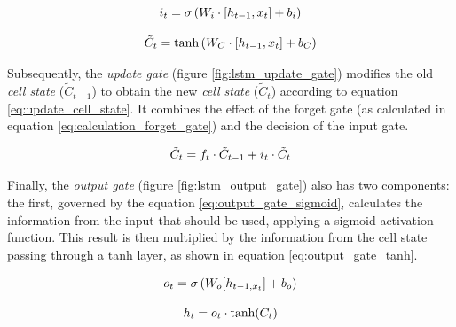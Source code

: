 \begin{equation}
    \centering
    i_t = \sigma \left(W_i \cdot [h_{t-1}, x_t] + b_i \right)
    \label{eq:input_gate}
\end{equation}

\begin{equation}
    \centering
    \tilde{C}_t = \text{tanh} \left(W_C \cdot [h_{t-1}, x_t] + b_C \right)
    \label{eq:candidates_cell_state}
\end{equation}

\noindent
Subsequently, the \textit{update gate} (figure \ref{fig:lstm_update_gate}) modifies the old \textit{cell state} ($\tilde{C}_{t-1}$) to obtain the new \textit{cell state} ($\tilde{C}_t$) according to equation \ref{eq:update_cell_state}. It combines the effect of the forget gate (as calculated in equation \ref{eq:calculation_forget_gate}) and the decision of the input gate.

\begin{equation}
    \centering
    \tilde{C}_t = f_t \cdot \tilde{C}_{t-1} + i_t \cdot \tilde{C}_{t}
    \label{eq:update_cell_state}
\end{equation}

\noindent
Finally, the \textit{output gate} (figure \ref{fig:lstm_output_gate}) also has two components: the first, governed by the equation \ref{eq:output_gate_sigmoid}, calculates the information from the input that should be used, applying a sigmoid activation function. This result is then multiplied by the information from the cell state passing through a \gls{tanh} layer, as shown in equation \ref{eq:output_gate_tanh}.

\begin{equation}
    \centering
    o_t = \sigma \left( W_o [h_{t-1,x_t}] + b_o \right)
    \label{eq:output_gate_sigmoid}
\end{equation}

\begin{equation}
    \centering
    h_t = o_t \cdot \text{tanh}(C_t)
    \label{eq:output_gate_tanh}
\end{equation}